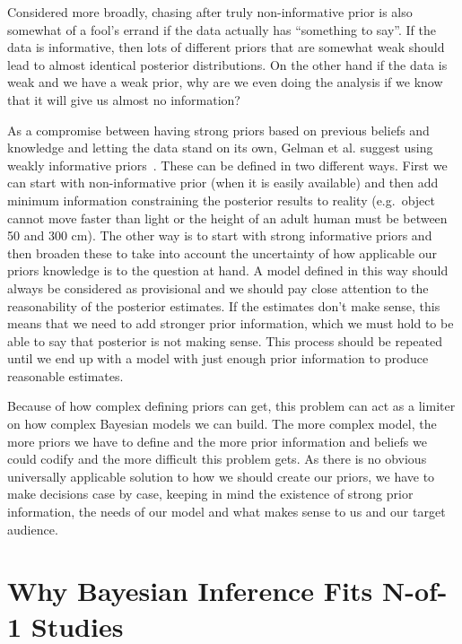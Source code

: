 \documentclass[12pt,a4paper,leqno]{report}
\theoremstyle{plain}
\theoremstyle{definition}
\theoremstyle{remark}
\begin{document}
Considered more broadly, chasing after truly non-informative prior is also
somewhat of a fool's errand if the data actually has ``something to say''.
If the data is informative, then lots of different priors that are somewhat weak
should lead to almost identical posterior distributions. On the other hand if the data is weak and we
have a weak prior, why are we even doing the analysis if we know that it will
give us almost no information?\ \cite{gelman}

As a compromise between having strong priors based on previous beliefs and knowledge and
letting the data stand on its own, Gelman et al.
suggest using weakly informative priors\ \cite{gelman}. These can be defined in two different
ways. First we can start with non-informative prior (when it is easily
available) and then add minimum information constraining the posterior results
to reality (e.g.\ object cannot move faster than light or the height of an adult human
must be between 50 and 300 cm). The other way is to start with strong informative
priors and then broaden these to take into account the uncertainty of
how applicable our priors knowledge is to the question at hand. A model defined in this
way should always be considered as provisional and we should pay close attention to the
reasonability of the posterior estimates. If the estimates don't make sense, this means
that we need to add stronger prior information, which we must hold to be able to say
that posterior is not making sense. This process should be repeated until we end up with
a model with just enough prior information to produce reasonable estimates.

Because of how complex defining priors can get, this problem can act as a limiter on
how complex Bayesian models we can build. The more complex model, the more priors we
have to define and the more prior information and beliefs we could codify and
the more difficult this problem gets. As there is no obvious universally applicable
solution to how we should create our priors, we have to make decisions case by case,
keeping in mind the existence of strong prior information, the needs of our model and
what makes sense to us and our target audience.

\section{Why Bayesian Inference Fits N-of-1 Studies}\label{whybayes}
\end{document}

